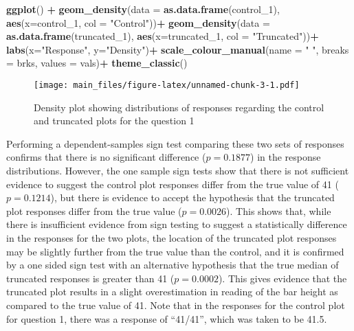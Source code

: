 \documentclass[
]{article}
\newenvironment{Shaded}{\begin{snugshade}}{\end{snugshade}}
\newcommand{\DataTypeTok}[1]{\textcolor[rgb]{0.13,0.29,0.53}{#1}}
\newcommand{\DecValTok}[1]{\textcolor[rgb]{0.00,0.00,0.81}{#1}}
\newcommand{\KeywordTok}[1]{\textcolor[rgb]{0.13,0.29,0.53}{\textbf{#1}}}
\newcommand{\NormalTok}[1]{#1}
\newcommand{\OperatorTok}[1]{\textcolor[rgb]{0.81,0.36,0.00}{\textbf{#1}}}
\newcommand{\StringTok}[1]{\textcolor[rgb]{0.31,0.60,0.02}{#1}}
\begin{document}
\begin{Shaded}
\begin{Highlighting}[]
\KeywordTok{ggplot}\NormalTok{() }\OperatorTok{+}
\StringTok{  }\KeywordTok{geom_density}\NormalTok{(}\DataTypeTok{data =} \KeywordTok{as.data.frame}\NormalTok{(control_}\DecValTok{1}\NormalTok{), }\KeywordTok{aes}\NormalTok{(}\DataTypeTok{x=}\NormalTok{control_}\DecValTok{1}\NormalTok{, }\DataTypeTok{col =} \StringTok{"Control"}\NormalTok{))}\OperatorTok{+}
\StringTok{  }\KeywordTok{geom_density}\NormalTok{(}\DataTypeTok{data =} \KeywordTok{as.data.frame}\NormalTok{(truncated_}\DecValTok{1}\NormalTok{), }\KeywordTok{aes}\NormalTok{(}\DataTypeTok{x=}\NormalTok{truncated_}\DecValTok{1}\NormalTok{, }\DataTypeTok{col =} \StringTok{"Truncated"}\NormalTok{))}\OperatorTok{+}
\StringTok{  }\KeywordTok{labs}\NormalTok{(}\DataTypeTok{x=}\StringTok{"Response"}\NormalTok{, }\DataTypeTok{y=}\StringTok{"Density"}\NormalTok{)}\OperatorTok{+}
\StringTok{  }\KeywordTok{scale_colour_manual}\NormalTok{(}\DataTypeTok{name =} \StringTok{" "}\NormalTok{, }\DataTypeTok{breaks =}\NormalTok{ brks, }\DataTypeTok{values =}\NormalTok{ vals)}\OperatorTok{+}
\StringTok{  }\KeywordTok{theme_classic}\NormalTok{()}
\end{Highlighting}
\end{Shaded}

\begin{figure}
\centering
\texttt{[image: main\_files/figure-latex/unnamed-chunk-3-1.pdf]}
\caption{Density plot showing distributions of responses regarding the
control and truncated plots for the question 1}
\end{figure}

Performing a dependent-samples sign test comparing these two sets of
responses confirms that there is no significant difference
(\(p = 0.1877\)) in the response distributions. However, the one sample
sign tests show that there is not sufficient evidence to suggest the
control plot responses differ from the true value of 41
(\(p = 0.1214\)), but there is evidence to accept the hypothesis that
the truncated plot responses differ from the true value
(\(p = 0.0026\)). This shows that, while there is insufficient evidence
from sign testing to suggest a statistically difference in the responses
for the two plots, the location of the truncated plot responses may be
slightly further from the true value than the control, and it is
confirmed by a one sided sign test with an alternative hypothesis that
the true median of truncated responses is greater than 41
(\(p=0.0002\)). This gives evidence that the truncated plot results in a
slight overestimation in reading of the bar height as compared to the
true value of 41. Note that in the responses for the control plot for
question 1, there was a response of ``41/41'', which was taken to be
41.5.
\end{document}
